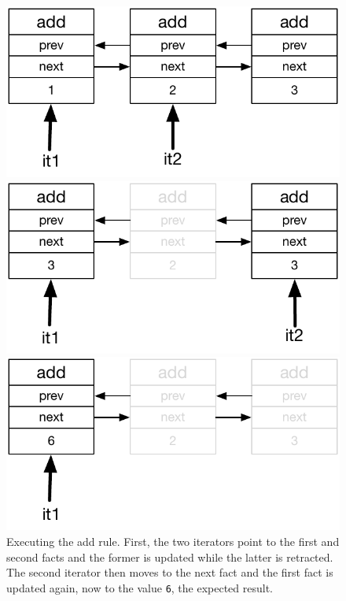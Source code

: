 \begin{figure}
\centering
\begin{minipage}{.5\textwidth}
  \centering
  \includegraphics[width=.8\linewidth]{figures/update}
\end{minipage}%
\begin{minipage}{.5\textwidth}
  \centering
  \includegraphics[width=0.8\linewidth]{figures/update2}
\end{minipage}
\begin{minipage}{.5\textwidth}
   \centering
  \includegraphics[width=0.8\linewidth]{figures/update3}
\end{minipage}
\caption{Executing the add rule. First, the two iterators point to
   the first and second facts and the former is updated while the latter is
   retracted. The second iterator then moves to the next fact and the first fact is
   updated again, now to the value \texttt{6}, the expected result.}
\label{fig:update_add}
\end{figure}

